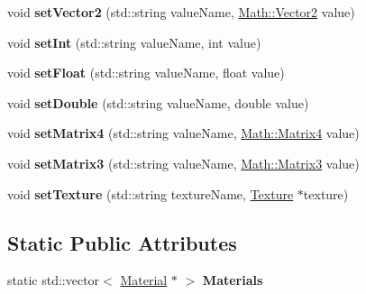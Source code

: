 \begin{DoxyCompactItemize}
\item 
\hypertarget{classBrickware_1_1Graphics_1_1Material_a436df26c48296d178738e982c2e996ca}{}void {\bfseries set\+Vector2} (std\+::string value\+Name, \hyperlink{classBrickware_1_1Math_1_1Vector2}{Math\+::\+Vector2} value)\label{classBrickware_1_1Graphics_1_1Material_a436df26c48296d178738e982c2e996ca}

\item 
\hypertarget{classBrickware_1_1Graphics_1_1Material_a4cae2d5d3a428f88d815e9847432e93f}{}void {\bfseries set\+Int} (std\+::string value\+Name, int value)\label{classBrickware_1_1Graphics_1_1Material_a4cae2d5d3a428f88d815e9847432e93f}

\item 
\hypertarget{classBrickware_1_1Graphics_1_1Material_a4aa5577c143dda36670cc5aa04fac64e}{}void {\bfseries set\+Float} (std\+::string value\+Name, float value)\label{classBrickware_1_1Graphics_1_1Material_a4aa5577c143dda36670cc5aa04fac64e}

\item 
\hypertarget{classBrickware_1_1Graphics_1_1Material_a9ac1800369b7b044c7ad884bc91dfb73}{}void {\bfseries set\+Double} (std\+::string value\+Name, double value)\label{classBrickware_1_1Graphics_1_1Material_a9ac1800369b7b044c7ad884bc91dfb73}

\item 
\hypertarget{classBrickware_1_1Graphics_1_1Material_af4f9ecc4700c8601a2db96ac008fcd57}{}void {\bfseries set\+Matrix4} (std\+::string value\+Name, \hyperlink{classBrickware_1_1Math_1_1Matrix4}{Math\+::\+Matrix4} value)\label{classBrickware_1_1Graphics_1_1Material_af4f9ecc4700c8601a2db96ac008fcd57}

\item 
\hypertarget{classBrickware_1_1Graphics_1_1Material_aaafa2481e7dc7438f6f3da08f9647a05}{}void {\bfseries set\+Matrix3} (std\+::string value\+Name, \hyperlink{classBrickware_1_1Math_1_1Matrix3}{Math\+::\+Matrix3} value)\label{classBrickware_1_1Graphics_1_1Material_aaafa2481e7dc7438f6f3da08f9647a05}

\item 
\hypertarget{classBrickware_1_1Graphics_1_1Material_acca72ac867e063e69b93c6f088e8589d}{}void {\bfseries set\+Texture} (std\+::string texture\+Name, \hyperlink{classBrickware_1_1Graphics_1_1Texture}{Texture} $\ast$texture)\label{classBrickware_1_1Graphics_1_1Material_acca72ac867e063e69b93c6f088e8589d}

\end{DoxyCompactItemize}
\subsection*{Static Public Attributes}
\begin{DoxyCompactItemize}
\item 
\hypertarget{classBrickware_1_1Graphics_1_1Material_a1fcb8081440b7c2a72a73478e531e374}{}static std\+::vector$<$ \hyperlink{classBrickware_1_1Graphics_1_1Material}{Material} $\ast$ $>$ {\bfseries Materials}\label{classBrickware_1_1Graphics_1_1Material_a1fcb8081440b7c2a72a73478e531e374}

\end{DoxyCompactItemize}
